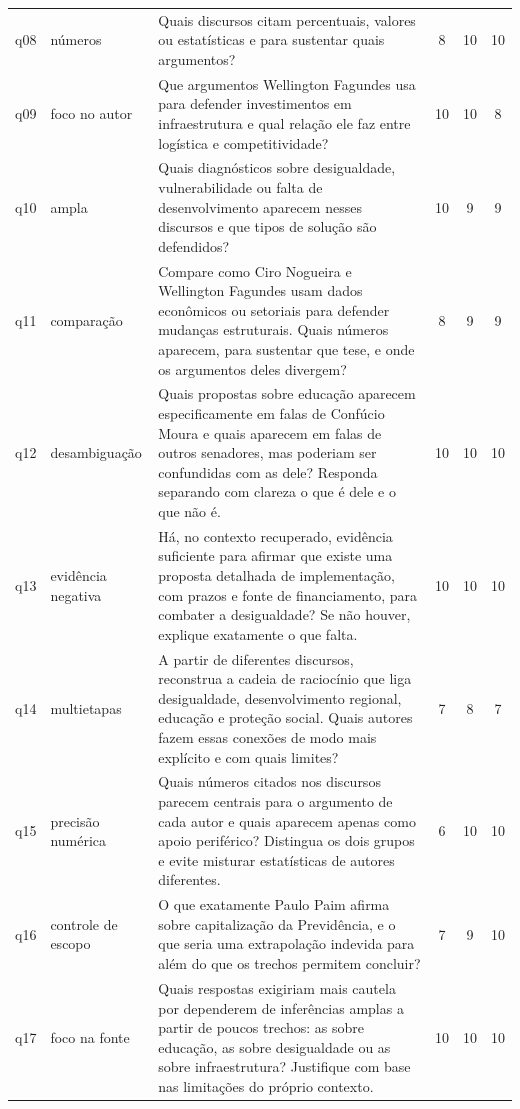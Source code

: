 \begin{longtable}{@{}p{}>{\raggedright\arraybackslash}p{}>{\raggedright\arraybackslash}p{}ccc@{}}
q08 & números & Quais discursos citam percentuais, valores ou estatísticas e para sustentar quais argumentos? & 8 & 10 & 10 \\
q09 & foco no autor & Que argumentos Wellington Fagundes usa para defender investimentos em infraestrutura e qual relação ele faz entre logística e competitividade? & 10 & 10 & 8 \\
q10 & ampla & Quais diagnósticos sobre desigualdade, vulnerabilidade ou falta de desenvolvimento aparecem nesses discursos e que tipos de solução são defendidos? & 10 & 9 & 9 \\
q11 & comparação & Compare como Ciro Nogueira e Wellington Fagundes usam dados econômicos ou setoriais para defender mudanças estruturais. Quais números aparecem, para sustentar que tese, e onde os argumentos deles divergem? & 8 & 9 & 9 \\
q12 & desambiguação & Quais propostas sobre educação aparecem especificamente em falas de Confúcio Moura e quais aparecem em falas de outros senadores, mas poderiam ser confundidas com as dele? Responda separando com clareza o que é dele e o que não é. & 10 & 10 & 10 \\
q13 & evidência negativa & Há, no contexto recuperado, evidência suficiente para afirmar que existe uma proposta detalhada de implementação, com prazos e fonte de financiamento, para combater a desigualdade? Se não houver, explique exatamente o que falta. & 10 & 10 & 10 \\
q14 & multietapas & A partir de diferentes discursos, reconstrua a cadeia de raciocínio que liga desigualdade, desenvolvimento regional, educação e proteção social. Quais autores fazem essas conexões de modo mais explícito e com quais limites? & 7 & 8 & 7 \\
q15 & precisão numérica & Quais números citados nos discursos parecem centrais para o argumento de cada autor e quais aparecem apenas como apoio periférico? Distingua os dois grupos e evite misturar estatísticas de autores diferentes. & 6 & 10 & 10 \\
q16 & controle de escopo & O que exatamente Paulo Paim afirma sobre capitalização da Previdência, e o que seria uma extrapolação indevida para além do que os trechos permitem concluir? & 7 & 9 & 10 \\
q17 & foco na fonte & Quais respostas exigiriam mais cautela por dependerem de inferências amplas a partir de poucos trechos: as sobre educação, as sobre desigualdade ou as sobre infraestrutura? Justifique com base nas limitações do próprio contexto. & 10 & 10 & 10 \\

\end{longtable}
